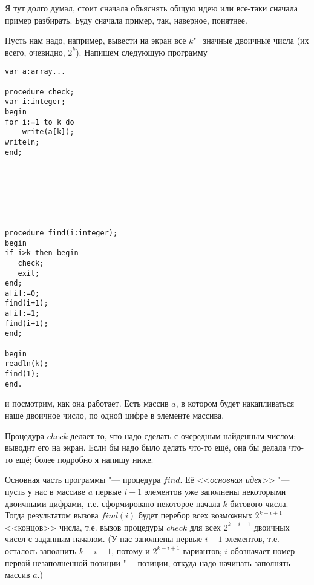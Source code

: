 
Я тут долго думал, стоит сначала объяснять общую идею или все-таки сначала 
пример разбирать. Буду сначала пример, так, наверное, понятнее.



Пусть нам надо, например, вывести на экран все $k$"=значные двоичные числа (их 
всего, очевидно, $2^k$). Напишем следующую программу 

\begin{codesample}\begin{verbatim}
var a:array...

procedure check;
var i:integer;
begin
for i:=1 to k do
    write(a[k]);
writeln;
end;







procedure find(i:integer);
begin
if i>k then begin
   check;
   exit;
end;
a[i]:=0;
find(i+1);
a[i]:=1;
find(i+1);
end;

begin
readln(k);
find(1);
end.
\end{verbatim}\end{codesample}

и посмотрим, как она работает. Есть массив $a$, в котором будет накапливаться 
наше двоичное число, по одной цифре в элементе массива.

Процедура $check$ делает то, что надо сделать с очередным найденным числом: 
выводит его на экран. Если бы надо было делать что-то ещё, она бы делала что-то 
ещё; более подробно я напишу ниже.

Основная часть программы "--- процедура $find$. Её <<\textit{основная идея}>> "--- пусть у нас 
в массиве $a$ первые $i-1$ элементов уже заполнены некоторыми двоичными цифрами, 
т.е. сформировано некоторое начала $k$-битового числа. Тогда результатом вызова 
$find(i)$ будет перебор всех возможных $2^{k-i+1}$ <<концов>> числа, т.е. вызов процедуры $check$ для всех $2^{k-i+1}$ двоичных чисел с заданным началом. (У нас заполнены 
первые $i-1$ элементов, т.е. осталось заполнить $k-i+1$, потому и $2^{k-i+1}$ 
вариантов; $i$ обозначает номер первой незаполненной позиции "--- позиции, откуда надо начинать заполнять массив $a$.)

